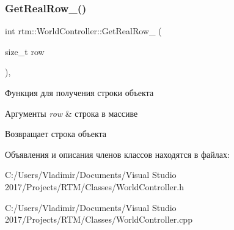 \subsubsection{\texorpdfstring{Get\+Real\+Row\+\_\+()}{GetRealRow\_()}}
{\footnotesize\ttfamily int rtm\+::\+World\+Controller\+::\+Get\+Real\+Row\+\_\+ (\begin{DoxyParamCaption}\item[{size\+\_\+t}]{row }\end{DoxyParamCaption})\hspace{0.3cm}{\ttfamily [inline]}, {\ttfamily [private]}}



Функция для получения строки объекта 


\begin{DoxyParams}{Аргументы}
{\em row} & строка в массиве \\
\hline
\end{DoxyParams}
\begin{DoxyReturn}{Возвращает}
строка объекта 
\end{DoxyReturn}


Объявления и описания членов классов находятся в файлах\+:\begin{DoxyCompactItemize}
\item 
C\+:/\+Users/\+Vladimir/\+Documents/\+Visual Studio 2017/\+Projects/\+R\+T\+M/\+Classes/World\+Controller.\+h\item 
C\+:/\+Users/\+Vladimir/\+Documents/\+Visual Studio 2017/\+Projects/\+R\+T\+M/\+Classes/World\+Controller.\+cpp\end{DoxyCompactItemize}
